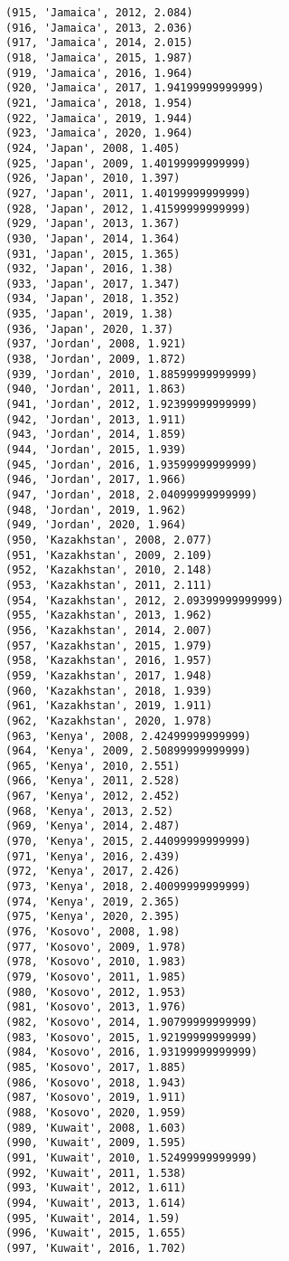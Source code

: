 \documentclass[11pt]{article}
\begin{document}
\begin{Verbatim}[commandchars=\\\{\}]
(915, 'Jamaica', 2012, 2.084)
(916, 'Jamaica', 2013, 2.036)
(917, 'Jamaica', 2014, 2.015)
(918, 'Jamaica', 2015, 1.987)
(919, 'Jamaica', 2016, 1.964)
(920, 'Jamaica', 2017, 1.94199999999999)
(921, 'Jamaica', 2018, 1.954)
(922, 'Jamaica', 2019, 1.944)
(923, 'Jamaica', 2020, 1.964)
(924, 'Japan', 2008, 1.405)
(925, 'Japan', 2009, 1.40199999999999)
(926, 'Japan', 2010, 1.397)
(927, 'Japan', 2011, 1.40199999999999)
(928, 'Japan', 2012, 1.41599999999999)
(929, 'Japan', 2013, 1.367)
(930, 'Japan', 2014, 1.364)
(931, 'Japan', 2015, 1.365)
(932, 'Japan', 2016, 1.38)
(933, 'Japan', 2017, 1.347)
(934, 'Japan', 2018, 1.352)
(935, 'Japan', 2019, 1.38)
(936, 'Japan', 2020, 1.37)
(937, 'Jordan', 2008, 1.921)
(938, 'Jordan', 2009, 1.872)
(939, 'Jordan', 2010, 1.88599999999999)
(940, 'Jordan', 2011, 1.863)
(941, 'Jordan', 2012, 1.92399999999999)
(942, 'Jordan', 2013, 1.911)
(943, 'Jordan', 2014, 1.859)
(944, 'Jordan', 2015, 1.939)
(945, 'Jordan', 2016, 1.93599999999999)
(946, 'Jordan', 2017, 1.966)
(947, 'Jordan', 2018, 2.04099999999999)
(948, 'Jordan', 2019, 1.962)
(949, 'Jordan', 2020, 1.964)
(950, 'Kazakhstan', 2008, 2.077)
(951, 'Kazakhstan', 2009, 2.109)
(952, 'Kazakhstan', 2010, 2.148)
(953, 'Kazakhstan', 2011, 2.111)
(954, 'Kazakhstan', 2012, 2.09399999999999)
(955, 'Kazakhstan', 2013, 1.962)
(956, 'Kazakhstan', 2014, 2.007)
(957, 'Kazakhstan', 2015, 1.979)
(958, 'Kazakhstan', 2016, 1.957)
(959, 'Kazakhstan', 2017, 1.948)
(960, 'Kazakhstan', 2018, 1.939)
(961, 'Kazakhstan', 2019, 1.911)
(962, 'Kazakhstan', 2020, 1.978)
(963, 'Kenya', 2008, 2.42499999999999)
(964, 'Kenya', 2009, 2.50899999999999)
(965, 'Kenya', 2010, 2.551)
(966, 'Kenya', 2011, 2.528)
(967, 'Kenya', 2012, 2.452)
(968, 'Kenya', 2013, 2.52)
(969, 'Kenya', 2014, 2.487)
(970, 'Kenya', 2015, 2.44099999999999)
(971, 'Kenya', 2016, 2.439)
(972, 'Kenya', 2017, 2.426)
(973, 'Kenya', 2018, 2.40099999999999)
(974, 'Kenya', 2019, 2.365)
(975, 'Kenya', 2020, 2.395)
(976, 'Kosovo', 2008, 1.98)
(977, 'Kosovo', 2009, 1.978)
(978, 'Kosovo', 2010, 1.983)
(979, 'Kosovo', 2011, 1.985)
(980, 'Kosovo', 2012, 1.953)
(981, 'Kosovo', 2013, 1.976)
(982, 'Kosovo', 2014, 1.90799999999999)
(983, 'Kosovo', 2015, 1.92199999999999)
(984, 'Kosovo', 2016, 1.93199999999999)
(985, 'Kosovo', 2017, 1.885)
(986, 'Kosovo', 2018, 1.943)
(987, 'Kosovo', 2019, 1.911)
(988, 'Kosovo', 2020, 1.959)
(989, 'Kuwait', 2008, 1.603)
(990, 'Kuwait', 2009, 1.595)
(991, 'Kuwait', 2010, 1.52499999999999)
(992, 'Kuwait', 2011, 1.538)
(993, 'Kuwait', 2012, 1.611)
(994, 'Kuwait', 2013, 1.614)
(995, 'Kuwait', 2014, 1.59)
(996, 'Kuwait', 2015, 1.655)
(997, 'Kuwait', 2016, 1.702)

\end{Verbatim}
\end{document}
